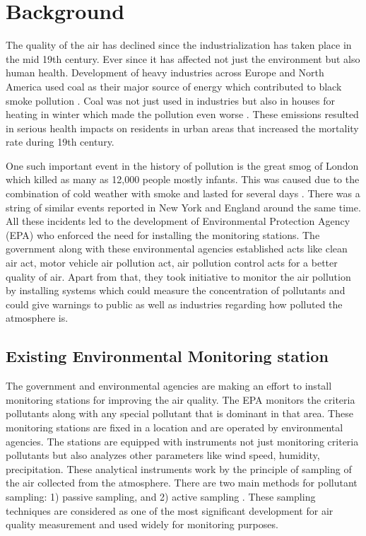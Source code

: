 \section{Background}

The quality of the air has declined since the industrialization has taken place in the mid 19th century. Ever since it has affected not just the environment but also human health. Development of heavy industries across Europe and North America used coal as their major source of energy which contributed to black smoke pollution \cite{Heidorn1978} \cite{Timothy}. Coal was not just used in industries but also in houses for heating in winter which made the pollution even worse \cite{Al2016}. These emissions resulted in serious health impacts on residents in urban areas that increased the mortality rate during 19th century. 
\par
One such important event in the history of pollution is the great smog of London which killed as many as 12,000 people mostly infants. This was caused due to the combination of cold weather with smoke and lasted for several days \cite{londonfog}. There was a string of similar events reported in New York and England around the same time. All these incidents led to the development of Environmental Protection Agency (EPA) who enforced the need for installing the monitoring stations. The government along with these environmental agencies established acts like clean air act, motor vehicle air pollution act, air pollution control acts for a better quality of air\cite{airpollutionact}. Apart from that, they took initiative to monitor the air pollution by installing systems which could measure the concentration of pollutants and could give warnings to public as well as industries regarding how polluted the atmosphere is.


\subsection{Existing Environmental Monitoring station}

The government and environmental agencies are making an effort to install monitoring stations for improving the air quality. The EPA monitors the criteria pollutants along with any special pollutant that is dominant in that area. These monitoring stations are fixed in a location and are operated by environmental agencies. The stations are equipped with instruments not just monitoring criteria pollutants but also analyzes other parameters like wind speed, humidity, precipitation. These analytical instruments work by the principle of sampling of the air collected from the atmosphere.
There are two main methods for pollutant sampling: 1) passive sampling, and 2) active sampling \cite{Balakrishnan2015} \cite{activepassive}. These sampling techniques are considered as one of the most significant development for air quality measurement and  used widely for monitoring purposes. 

